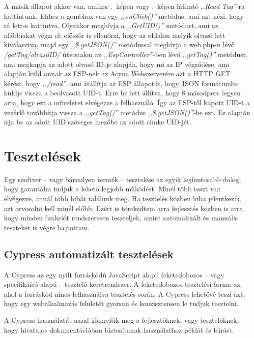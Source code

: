 \documentclass[
]{thesis-ekf}
\theoremstyle{definition}
\theoremstyle{remark}
\begin{document}
	A másik állapot akkor van, amikor .~képen vagy .~képen látható \emph{,,Read Tag''}-ra kattintunk. Ehhez a gombhoz van egy \emph{,,onClick()''} metódus, ami azt nézi, hogy rá lett-e kattintva. Olyankor meghívja a \emph{,,GetUID()''} metódust, ami az alábbiakat végzi el: először is ellenőrzi, hogy az oldalon melyik olvasó lett kiválasztva, majd egy \emph{,,\$.getJSON()''} metódussal meghívja a web.php-n lévő \emph{/getTag/olvasóID/} útvonalon az \emph{,,EspController''}-ben lévő \emph{,,getTag()''} metódust, ami megkapja az adott olvasó ID-je alapján, hogy mi az IP végződése, ami alapján küld annak az ESP-nek az Acync Webszerverére azt a HTTP GET kérést, hogy \emph{,,/read''}, ami átállítja az ESP állapotát, hogy JSON formátumba küldje vissza a beolvasott UID-t. Erre be lett állítva, hogy 8 másodperc legyen arra, hogy ezt a műveletet elvégezze a felhasználó. Így az ESP-től kapott UID-t a vezérlő továbbítja vissza a \emph{,,getTag()''} metódus \emph{,,\$.getJSON()''}-be ezt. Ez alapján írja be az adott UID szöveges mezőbe az adott címke UID-jét.
	
	
	\chapter{Tesztelések}
	Egy szoftver -- vagy bármilyen termék -- tesztelése az egyik legfontosabb dolog, hogy garantálni tudjuk a lehető legjobb működést. Minél több teszt van elvégezve, annál több hibát találunk meg. Ha tesztelés közben hiba jelentkezik, azt orvosolni kell minél előbb. Ezért is törekedtem arra fejlesztés közben is arra, hogy minden funkciót rendszeresen teszteljek, amire automatizált és manuális teszteket is végre hajtottam.
	
	\section{Cypress automatizált tesztelések}
	
	A Cypress az egy nyílt forráskódú JavaScript alapú feketedobozos -- vagy specifikáicó alapú -- tesztelő keretrendszer. A feketedobozos tesztelési forma az, ahol a forráskód nincs felhasználva tesztelés során. A Cypress lehetővé teszi azt, hogy egy webalkalmazás felületét gyorsan és konzisztensen le tudjuk tesztelni. 
	
	A Cypress használatát azzal könnyítik meg a fejlesztőknek, vagy tesztelőknek, hogy hivatalos dokumentációban biztosítanak használathoz példát és leírást.\cite{cypress-docs}
	
\end{document}
